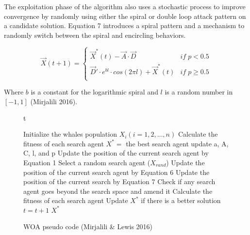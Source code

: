 \documentclass[11pt]{article}
\begin{document}
{    The exploitation phase of the algorithm also uses a stochastic process to improve convergence by randomly using either the spiral or double loop attack pattern on a candidate solution.
    Equation 7 introduces a spiral pattern and a mechanism to randomly switch between the spiral and encircling behaviors.

    \begin{equation}
        \vec{X}(t+1) =
        \begin{cases}
            \vec{X}^*(t) - \vec{A}\cdot\vec{D} &if \; p < 0.5\\
            \vec{D}'\cdot e^{bl} \cdot cos(2\pi l) + \vec{X}^*(t) &if \; p \geq 0.5\\
        \end{cases}
    \end{equation}

    Where $b$ is a constant for the logarithmic spiral and $l$ is a random number in $[-1, 1]$ (Mirjalili 2016).

    \begin{figure}{t}
        \caption{WOA pseudo code (Mirjalili \& Lewis 2016)}
        \begin{algorithm}[H]
            \scriptsize
            \begin{algorithmic}[1]
                \STATE Initialize the whales population $X_i(i = 1,2, \dots, n)$
                \STATE Calculate the fitness of each search agent
                \STATE $X^* = $ the best search agent
                        \STATE update a, A, C, l, and p
                                \STATE Update the position of the current search agent by Equation 1
                            \ELSE
                                \STATE Select a random search agent ($X_{rand}$)
                                \STATE Update the position of the current search agent by Equation 6
                            \ENDIF
                        \ELSE
                            \STATE Update the position of the current search by Equation 7
                        \ENDIF
                    \ENDFOR
                    \STATE Check if any search agent goes beyond the search space and amend it
                    \STATE Calculate the fitness of each search agent
                    \STATE Update $X^*$ if there is a better solution
                    \STATE $t = t+1$
                \ENDWHILE
                \STATE \RETURN $X^*$ 
            \end{algorithmic}
        \end{algorithm}
    \end{figure}

}
\end{document}
